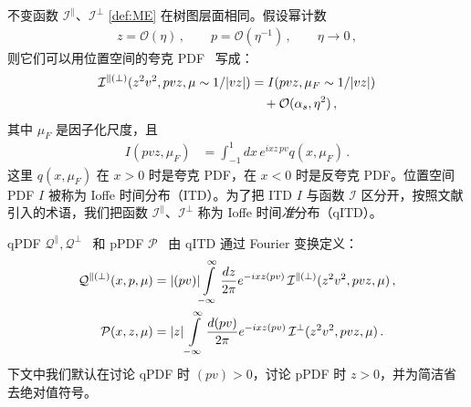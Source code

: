 不变函数 $\mathcal{I}^{\parallel}$、$\mathcal{I}^{\perp}$ \eqref{def:ME} 在树图层面相同。假设幂计数
\begin{align}
\label{power-counting}
  z = \mathcal{O}(\eta)\,, \qquad p = \mathcal{O}(\eta^{-1})\,,\qquad \eta \to 0\,,
\end{align}
则它们可以用位置空间的夸克 PDF~\cite{Ioffe:1969kf,Braun:1994jq,Hoyer:1996nr} 写成：
\begin{align}
  \mathcal{I}^{\parallel(\perp)}(z^2v^2,pvz, \mu\sim 1/|vz|) &=  I(pvz, \mu_F \sim 1/|vz|)
\notag\\&\quad
 +\mathcal{O}(\alpha_s, \eta^2)\,,
\end{align}
其中 $\mu_F$ 是因子化尺度，且
\begin{align}
\label{ITD}
   I(pvz,\mu_F) &=  \int_{-1}^1 dx \, e^{ixz\,pv} q(x,\mu_F)\,.
\end{align}
这里 $q(x,\mu_F)$ 在 $x>0$ 时是夸克 PDF，在 $x<0$ 时是反夸克 PDF。位置空间 PDF $I$ 被称为 Ioffe 时间分布（ITD）。为了把 ITD $I$ 与函数 $\mathcal{I}$ 区分开，按照文献 \cite{Ji:2013dva} 引入的术语，我们把函数 $\mathcal{I}^{\parallel}$、$\mathcal{I}^{\perp}$ 称为 Ioffe 时间\emph{准}分布（qITD）。

qPDF $\mathcal{Q}^{\parallel},\mathcal{Q}^{\perp}$~\cite{Ji:2013dva} 和 pPDF $\mathcal{P}$~\cite{Radyushkin:2017cyf}
由 qITD 通过 Fourier 变换定义：
\begin{align}
\label{def:qPDF+pPDF}
\mathcal{Q}^{\parallel(\perp)}(x,p,\mu) &= |(pv)|\! \int\limits_{-\infty}^\infty \frac{d z }{2\pi} e^{-ix z (pv)} \, \mathcal{I}^{\parallel(\perp)}(z^2v^2, pvz,\mu )\,,
\notag\\
\mathcal{P}(x,z,\mu) &= |z| \int\limits_{-\infty}^\infty \frac{d (pv)}{2\pi} e^{-ix z (pv) } \,  \mathcal{I}^{\perp}(z^2v^2,pvz,\mu)\,.
\end{align}
下文中我们默认在讨论 qPDF 时 $(pv)>0$，讨论 pPDF 时 $z>0$，并为简洁省去绝对值符号。

